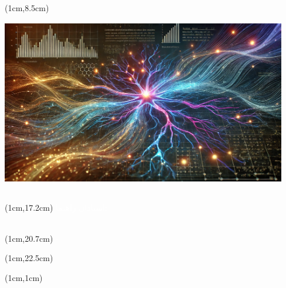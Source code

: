 \begin{textblock*}{12.5cm}(1cm,8.5cm)
    \includegraphics[width=12.5cm,height=8cm]{assets/cover}
\end{textblock*}

\begin{textblock*}{12.5cm}(1cm,17.2cm)
    \textcolor{white}{استادان راهنما: \\ \textbf{\PersianSupervisor \\ \PersianSupervisorB}}
\end{textblock*}

\begin{textblock*}{12.5cm}(1cm,20.7cm)
    \textcolor{white}{{\PersianSchool} - {\PersianDepartment}}
\end{textblock*}

\begin{textblock*}{2.5cm}(1cm,22.5cm)
\end{textblock*}

\begin{textblock*}{14.7cm}(1cm,1cm)
\end{textblock*}

\null\clearpage
